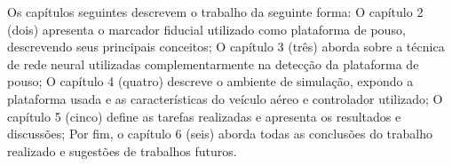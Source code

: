 Os capítulos seguintes descrevem o trabalho da seguinte forma: O capítulo 2 (dois) apresenta o marcador fiducial utilizado como plataforma de pouso, descrevendo seus principais conceitos; O capítulo 3 (três) aborda sobre a técnica de rede neural utilizadas complementarmente na detecção da plataforma de pouso; O capítulo 4 (quatro) descreve o ambiente de simulação, expondo a plataforma usada e as características do veículo aéreo e controlador utilizado; O capítulo 5 (cinco) define as tarefas realizadas e apresenta os resultados e discussões; Por fim, o capítulo 6 (seis) aborda todas as conclusões do trabalho realizado e sugestões de trabalhos futuros.




